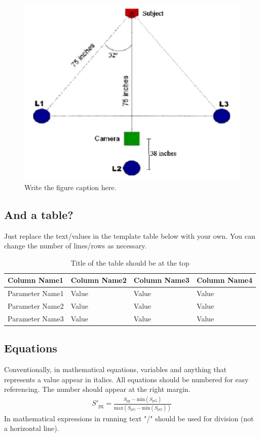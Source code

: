 \documentclass[times,twocolumn,final,authoryear]{elsarticle}
\begin{document}
\begin{figure}
\centering
\includegraphics[scale=0.5]{fig01.pdf}
\caption{Write the figure caption here.}
\label{fig:pendulum}
\end{figure}

\subsection{And a table?}
Just replace the text/values in the template table below 
with your own. You can change the number of 
lines/rows as necessary.

\begin{table}
\centering
\caption{Title of the table should be at the top}
\begin{tabular}{|l|l|l|l|}
\hline
Column Name1    & Column Name2 & Column Name3 & Column Name4 \\
\hline
Parameter Name1 & Value        & Value        & Value        \\
\hline
Parameter Name2 & Value        & Value        & Value        \\
\hline
Parameter Name3 & Value        & Value        & Value        \\
\hline
\end{tabular}
\end{table}

\subsection{Equations}
Conventionally, in mathematical equations, variables and
anything that represents a value appear in italics. 
All equations should be numbered for easy referencing. 
The number should appear at the right margin.
\begin{eqnarray}
S'_{\mathrm{pg}} = \frac{S_{\mathrm{pg}} - \mathrm{min}(S_{\mathrm{pG}})}
  {\mathrm{max}(S_{\mathrm{pG}} - \mathrm{min}(S_{\mathrm{pG}}))}
\end{eqnarray}
In mathematical expressions 
in running text "/" should be used
for division (not a horizontal line).
\end{document}
